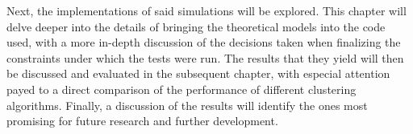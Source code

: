 Next, the implementations of said simulations will be explored. This chapter will delve deeper into the details of bringing the theoretical models into the code used, with a more in-depth discussion of the decisions taken when finalizing the constraints under which the tests were run. The results that they yield will then be discussed and evaluated in the subsequent chapter, with especial attention payed to a direct comparison of the performance of different clustering algorithms. Finally, a discussion of the results will identify the ones most promising for future research and further development.
